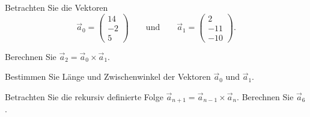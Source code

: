 %
%
%
%
Betrachten Sie die Vektoren
\[
\vec{a}_0
=
\begin{pmatrix} 14\\-2\\5 \end{pmatrix}
\qquad\text{und}\qquad
\vec{a}_1
=
\begin{pmatrix} 2\\-11\\-10 \end{pmatrix}.
\]
\begin{teilaufgaben}
\item
Berechnen Sie $\vec{a}_2 = \vec{a}_0\times\vec{a}_1$.
\item
Bestimmen Sie Länge und Zwischenwinkel der Vektoren $\vec{a}_0$ und
$\vec{a}_1$.
\item
Betrachten Sie die rekursiv definierte Folge
$\vec{a}_{n+1} = \vec{a}_{n-1} \times\vec{a}_n$.
Berechnen Sie $\vec{a}_{6}$.
\end{teilaufgaben}


